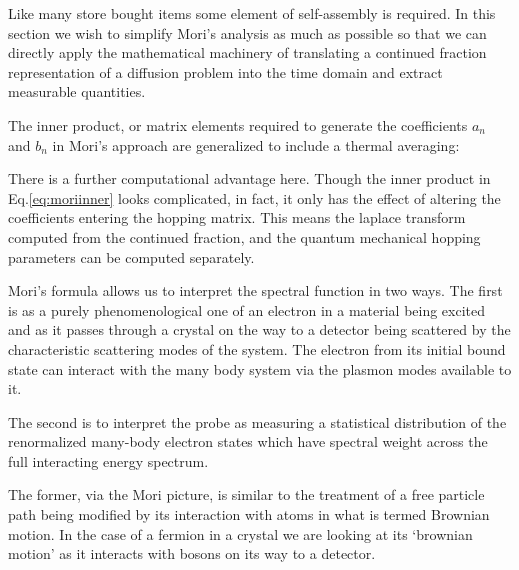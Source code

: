 Like many store bought items some element of self-assembly is required. In this
section we wish to simplify Mori's analysis as much as possible so that we can directly 
apply the mathematical machinery of translating a continued fraction representation of
a diffusion problem into the time domain and extract measurable quantities.

The inner product, or matrix elements required to generate the coefficients 
$a_{n}$ and $b_{n}$ in Mori's approach are generalized to include a thermal averaging:


There is a further computational advantage here. Though the inner product in Eq.\ref{eq:moriinner}
looks complicated, in fact, it only has the effect of altering the coefficients entering
the hopping matrix. This means the laplace transform computed from the continued fraction,
and the quantum mechanical hopping parameters can be computed separately.

Mori's formula allows us to interpret the spectral function in two ways. The first is as
a purely phenomenological one of an electron in a material being excited and as it passes through
a crystal on the way to a detector being scattered by the characteristic scattering modes of the
system. The electron from its initial bound state can interact with the many body system via
the plasmon modes available to it.

The second is to interpret the probe as measuring a statistical distribution of the 
renormalized many-body electron states which have spectral weight across the full
interacting energy spectrum. 

The former, via the Mori picture, is similar to the treatment of a free particle path
being modified by its interaction with atoms in what is termed Brownian motion. In the
case of a fermion in a crystal we are looking at its `brownian motion' as it interacts
with bosons on its way to a detector.

